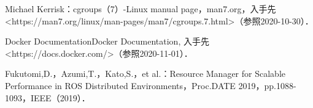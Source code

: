 \documentclass[11pt]{ujarticle} %
\begin{document}
\begin{thebibliography}{99}
\begin{flushleft}
  Michael Kerrisk：cgroups（7）-Linux manual page，man7.org，入手先\textless https://man7.org/linux/man-pages/man7/cgroups.7.html\textgreater（参照2020-10-30）．
  \end{flushleft}
  \begin{flushleft}
  Docker Documentation\textbar Docker Documentation, 入手先\textless https://docs.docker.com/\textgreater（参照2020-11-01）．\end{flushleft}
  \begin{flushleft}
  Fukutomi,D.，Azumi,T.，Kato,S.，et al.：Resource Manager for Scalable Performance in ROS Distributed Environments，Proc.DATE 2019，pp.1088-1093，IEEE（2019）．
  \end{flushleft}

\end{thebibliography}
\end{document}
